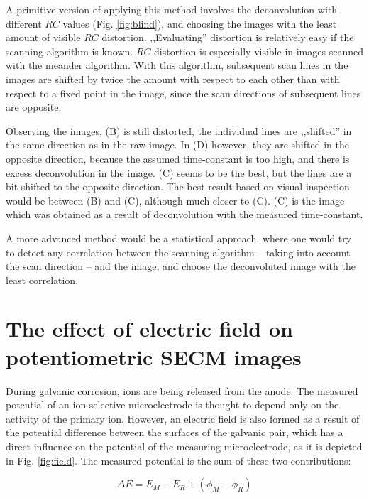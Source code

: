 A primitive version of applying this method involves the deconvolution with different $RC$ values (Fig. \ref{fig:blind}), and choosing the images with the least amount of visible $RC$ distortion.
,,Evaluating'' distortion is relatively easy if the scanning algorithm is known.
$RC$ distortion is especially visible in images scanned with the meander algorithm.
With this algorithm, subsequent scan lines in the images are shifted by twice the amount with respect to each other than with respect to a fixed point in the image, since the scan directions of subsequent lines are opposite.


Observing the images, (B) is still distorted, the individual lines are ,,shifted'' in the same direction as in the raw image.
In (D) however, they are shifted in the opposite direction, because the assumed time-constant is too high, and there is excess deconvolution in the image.
(C) seems to be the best, but the lines are a bit shifted to the opposite direction.
The best result based on visual inspection would be between (B) and (C), although much closer to (C).
(C) is the image which was obtained as a result of deconvolution with the measured time-constant.

A more advanced method would be a statistical approach, where one would try to detect any correlation between the scanning algorithm -- taking into account the scan direction -- and the image, and choose the deconvoluted image with the least correlation.



\newpage
\section{The effect of electric field on potentiometric SECM images}

During galvanic corrosion, ions are being released from the anode.
The measured potential of an ion selective microelectrode is thought to depend only on the activity of the primary ion.
However, an electric field is also formed as a result of the potential difference between the surfaces of the galvanic pair, which has a direct influence on the potential of the measuring microelectrode, as it is depicted in Fig. \ref{fig:field}. The measured potential is the sum of these two contributions:

\begin{equation}
\Delta E=E_M-E_R + (\phi_M - \phi_R)
\label{eq:potential}
\end{equation}

